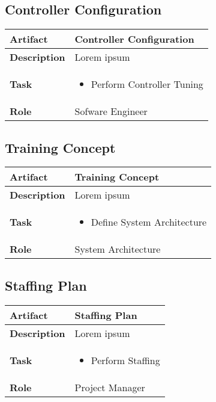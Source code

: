 \subsection{Controller Configuration}
\begin{minipage}{\textwidth}
 \label{table:ch6_Artifact_Controller_Configuration}
\begin{tabular}
	{|m{2cm}|m{10cm}|} \hline \bfseries Artifact & Controller Configuration\\
	\hline \bfseries Description & Lorem ipsum\\
	\hline \bfseries Task & 
	\begin{itemize}
		\item Perform Controller Tuning
	\end{itemize}
	\\
	\hline \bfseries Role & Sofware Engineer\\
	\hline 
\end{tabular}
\end{minipage}

\subsection{Training Concept}
\begin{minipage}{\textwidth}
 \label{table:ch6_Artifact_Training_Concept}
\begin{tabular}
	{|m{2cm}|m{10cm}|} \hline \bfseries Artifact & Training Concept\\
	\hline \bfseries Description & Lorem ipsum\\
	\hline \bfseries Task & 
	\begin{itemize}
		\item Define System Architecture 
	\end{itemize}
	\\
	\hline \bfseries Role & System Architecture\\
	\hline 
\end{tabular}
\end{minipage}

\subsection{Staffing Plan}
\begin{minipage}{\textwidth}
 \label{table:ch6_Artifact_Staffing_Plan}
\begin{tabular}
	{|m{2cm}|m{10cm}|} \hline \bfseries Artifact & Staffing Plan\\
	\hline \bfseries Description & Lorem ipsum\\
	\hline \bfseries Task & 
	\begin{itemize}
		\item Perform Staffing
	\end{itemize}
	\\
	\hline \bfseries Role & Project Manager\\
	\hline 
\end{tabular}
\end{minipage}

